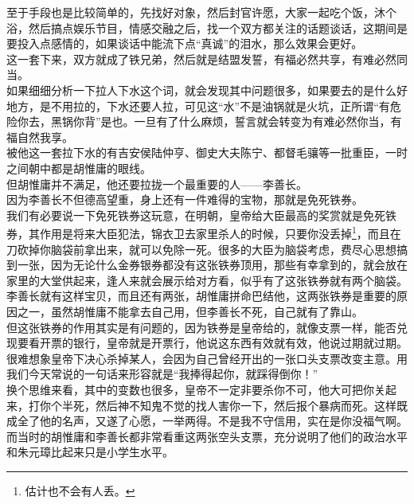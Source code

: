\begin{multicols}{\theparacolNo}
至于手段也是比较简单的，先找好对象，然后封官许愿，大家一起吃个饭，沐个浴，然后搞点娱乐节目，情感交融之后，找一个双方都关注的话题谈话，这期间是要投入点感情的，如果谈话中能流下点“真诚”的泪水，那么效果会更好。\\

这一套下来，双方就成了铁兄弟，然后就是结盟发誓，有福必然共享，有难必然同当。\\

如果细细分析一下拉人下水这个词，就会发现其中问题很多，如果要去的是什么好地方，是不用拉的，下水还要人拉，可见这“水”不是油锅就是火坑，正所谓“有危险你去，黑锅你背”是也。一旦有了什么麻烦，誓言就会转变为有难必然你当，有福自然我享。\\

被他这一套拉下水的有吉安侯陆仲亨、御史大夫陈宁、都督毛骧等一批重臣，一时之间朝中都是胡惟庸的眼线。\\

但胡惟庸并不满足，他还要拉拢一个最重要的人——李善长。\\

因为李善长不但德高望重，身上还有一件难得的宝物，那就是免死铁券。\\

我们有必要说一下免死铁券这玩意，在明朝，皇帝给大臣最高的奖赏就是免死铁券，其作用是将来大臣犯法，锦衣卫去家里杀人的时候，只要你没丢掉\footnote{估计也不会有人丢。}，而且在刀砍掉你脑袋前拿出来，就可以免除一死。很多的大臣为脑袋考虑，费尽心思想搞到一张，因为无论什么金券银券都没有这张铁券顶用，那些有幸拿到的，就会放在家里的大堂供起来，逢人来就会展示给对方看，似乎有了这张铁券就有两个脑袋。\\

李善长就有这样宝贝，而且还有两张，胡惟庸拼命巴结他，这两张铁券是重要的原因之一，虽然胡惟庸不能拿去自己用，但李善长不死，自己就有了靠山。\\

但这张铁券的作用其实是有问题的，因为铁券是皇帝给的，就像支票一样，能否兑现要看开票的银行，皇帝就是开票行，他说这东西有效就有效，他说过期就过期。很难想象皇帝下决心杀掉某人，会因为自己曾经开出的一张口头支票改变主意。用我们今天常说的一句话来形容就是“我捧得起你，就踩得倒你！”\\

换个思维来看，其中的变数也很多，皇帝不一定非要杀你不可，他大可把你关起来，打你个半死，然后神不知鬼不觉的找人害你一下，然后报个暴病而死。这样既成全了他的名声，又遂了心愿，一举两得。不是我不守信用，实在是你没福气啊。\\

而当时的胡惟庸和李善长都非常看重这两张空头支票，充分说明了他们的政治水平和朱元璋比起来只是小学生水平。\\


\end{multicols}
